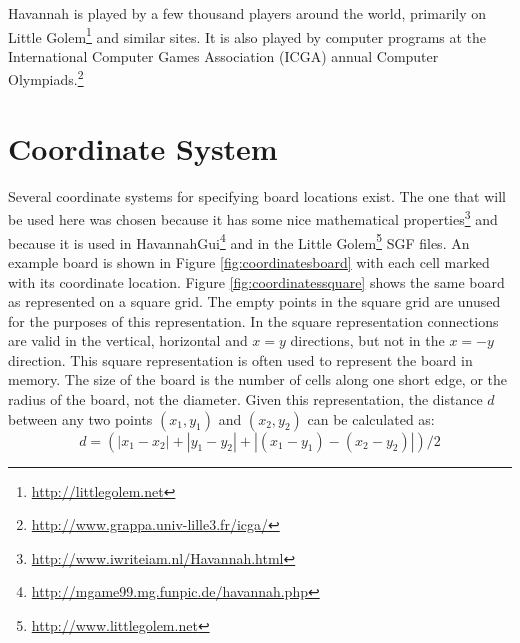 Havannah is played by a few thousand players around the world, primarily on Little Golem\footnote{\url{http://littlegolem.net}} and similar sites. It is also played by computer programs at the International Computer Games Association (ICGA) annual Computer Olympiads.\footnote{\url{http://www.grappa.univ-lille3.fr/icga/}}



\section{Coordinate System}

Several coordinate systems for specifying board locations exist. The one that will be used here was chosen because it has some nice mathematical properties\footnote{\url{http://www.iwriteiam.nl/Havannah.html}} and because it is used in HavannahGui\footnote{\url{http://mgame99.mg.funpic.de/havannah.php}} and in the Little Golem\footnote{\url{http://www.littlegolem.net}} SGF files. An example board is shown in Figure \ref{fig:coordinatesboard} with each cell marked with its coordinate location. Figure \ref{fig:coordinatessquare} shows the same board as represented on a square grid. The empty points in the square grid are unused for the purposes of this representation. In the square representation connections are valid in the vertical, horizontal and $x=y$ directions, but not in the $x=-y$ direction. This square representation is often used to represent the board in memory. The size of the board is the number of cells along one short edge, or the radius of the board, not the diameter. Given this representation, the distance $d$ between any two points $(x_1,y_1)$ and $(x_2,y_2)$ can be calculated as: $$d = (|x_1-x_2| + |y_1-y_2| + |(x_1-y_1)-(x_2-y_2)|)/2$$



